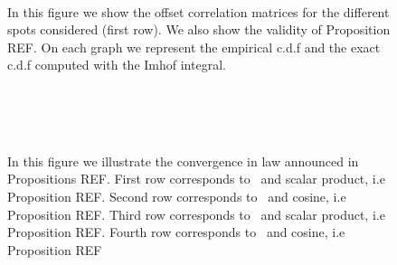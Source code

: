     \begin{figure}[H]
    \centering
     \hfill
     \hfill
     \\
     \hfill
     \hfill
     \hfill
    \caption{In this figure we show the offset correlation matrices for the different spots considered (first row). We also show the validity of Proposition REF. On each graph we represent the empirical c.d.f and the exact c.d.f computed with the Imhof integral.}
    \label{fig:l2}    
  \end{figure}
  \begin{figure}[H]
     \hfill
     \hfill
     \\
     \hfill
     \hfill
     \\
     \hfill
     \hfill
     \\
    
     \hfill
     \hfill
     \hfill
    \caption{In this figure we illustrate the convergence in law announced in Propositions REF. First row corresponds to \internalmatching \ and scalar product, i.e Proposition REF. Second row corresponds to \internalmatching \ and cosine, i.e Proposition REF. Third row corresponds to \templatematching \ and scalar product, i.e Proposition REF. Fourth row corresponds to \templatematching \ and cosine, i.e Proposition REF}
    \label{fig:tcl}
    \end{figure}

